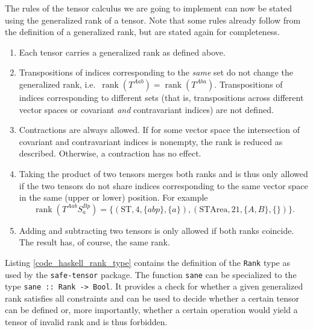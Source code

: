 The rules of the tensor calculus we are going to implement can now be stated using the generalized rank of a tensor. Note that some rules already follow from the definition of a generalized rank, but are stated again for completeness.
\begin{enumerate}
  \item Each tensor carries a generalized rank as defined above.
  \item Transpositions of indices corresponding to the \emph{same} set do not change the generalized rank, i.e.\ $\operatorname{rank}(T^{Aab}) = \operatorname{rank}(T^{Aba})$. Transpositions of indices corresponding to different sets (that is, transpositions across different vector spaces or covariant \emph{and} contravariant indices) are not defined.
  \item Contractions are always allowed. If for some vector space the intersection of covariant and contravariant indices is nonempty, the rank is reduced as described. Otherwise, a contraction has no effect.
  \item Taking the product of two tensors merges both ranks and is thus only allowed if the two tensors do not share indices corresponding to the same vector space in the same (upper or lower) position. For example
    \begin{equation}
      \operatorname{rank}(T^{Aab} S^{Bp}_{a}) = \{(\text{ST}, 4, \{abp\}, \{a\}), (\text{STArea}, 21, \{A,B\}, \{\})\}.
    \end{equation}
  \item Adding and subtracting two tensors is only allowed if both ranks coincide. The result has, of course, the same rank.
\end{enumerate}

Listing \ref{code_haskell_rank_type} contains the definition of the \texttt{Rank} type as used by the \texttt{safe-tensor} package. The function \texttt{sane} can be specialized to the type \texttt{sane :: Rank -> Bool}. It provides a check for whether a given generalized rank satisfies all constraints and can be used to decide whether a certain tensor can be defined or, more importantly, whether a certain operation would yield a tensor of invalid rank and is thus forbidden.

